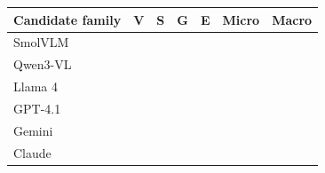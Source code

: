 \begin{tabularx}{\linewidth}{Xrrrrrr}
\toprule
Candidate family & V & S & G & E & Micro & Macro\\\midrule
SmolVLM &  &  &  &  &  & \\
Qwen3-VL &  &  &  &  &  & \\
Llama 4 &  &  &  &  &  & \\
GPT-4.1 &  &  &  &  &  & \\
Gemini &  &  &  &  &  & \\
Claude &  &  &  &  &  & \\
\bottomrule
\end{tabularx}
